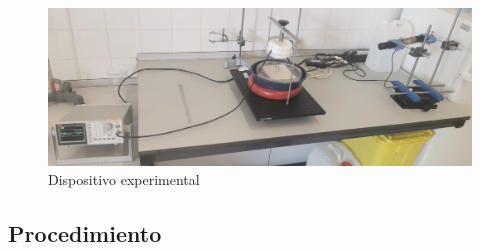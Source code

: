 \documentclass[a4paper,12pt,spanish]{article}
\begin{document}
\begin{figure}[H]
	\centering
	\includegraphics[width=0.9\linewidth]{../fotos/IMG_20240307_101213-r}
	\caption{Dispositivo experimental}
	\label{fig:img20240307101213-r}
\end{figure}
	
	\subsection*{Procedimiento}
	
\end{document}
